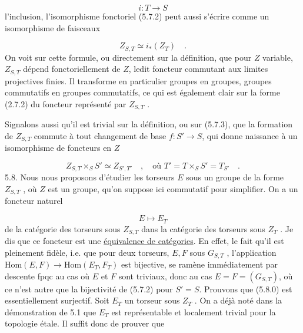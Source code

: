 
\begin{equation*}
 i : T \longrightarrow S
\end{equation*}
l'inclusion, l'isomorphisme fonctoriel (5.7.2) peut aussi s'écrire comme un isomorphisme de faisceaux

\begin{equation}\tag{5.7.3}
Z_{S,T} \simeq i_*(Z_T) \quad .
\end{equation}
On voit sur cette formule, ou directement sur la définition, que pour $Z$ variable, $Z_{S,T}$ dépend fonctoriellement de $Z$, ledit foncteur commutant aux limites projectives finies. Il transforme en particulier groupes en groupes, groupes commutatifs en groupes commutatifs, ce qui est également clair sur la forme (2.7.2) du foncteur représenté par $Z_{S,T}$ .

Signalons aussi qu'il est trivial sur la définition, ou sur (5.7.3), que la formation de $Z_{S,T}$ commute à tout changement de base $f : S' \longrightarrow S$, qui donne naissance à un isomorphisme de foncteurs en $Z$

\begin{equation}\tag{5.7.4}
Z_{S,T} \times_S S' \simeq Z_{S',T'} \quad , \quad \text{où } T' = T \times_S S' = T_{S'} \quad .
\end{equation}
5.8. Nous nous proposons d'étudier les torseurs $E$ sous un groupe de la forme $Z_{S,T}$ , où $Z$ est un groupe, qu'on suppose ici commutatif pour simplifier. On a un foncteur naturel

\begin{equation}\tag{5.8.0}
E \longmapsto E_T
\end{equation}
de la catégorie des torseurs sous $Z_{S,T}$ dans la catégorie des torseurs sous $Z_T$ . Je dis que ce foncteur est une \underline{équivalence de catégories}. En effet, le fait qu'il est pleinement fidèle, i.e. que pour deux torseurs, $E,F$ sous $G_{S,T}$ , l'application $\mathrm{Hom}(E,F) \longrightarrow \mathrm{Hom}(E_T,F_T)$ est bijective, se ramène immédiatement par descente fpqc au cas où $E$ et $F$
sont triviaux, donc au cas $E = F = (G_{S,T})$, où ce n'est autre que la bijectivité de (5.7.2) pour $S'=S$. Prouvons que (5.8.0) est essentiellement surjectif. Soit $E_T$ un torseur sous $Z_T$ . On a déjà noté dans la démonstration de 5.1 que $E_T$ est représentable et localement trivial pour la topologie étale. Il suffit donc de prouver que

